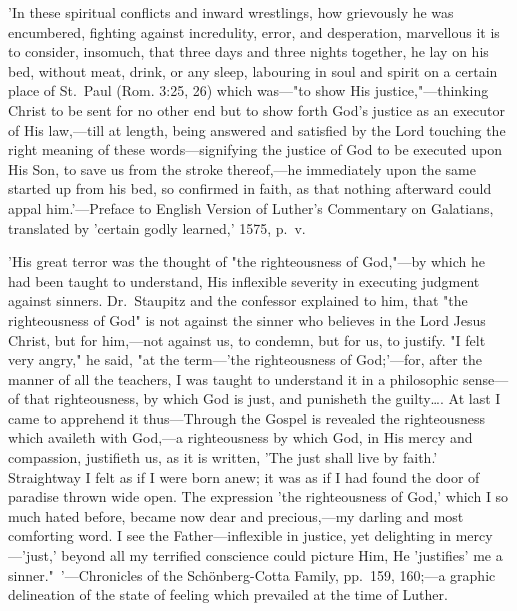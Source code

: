 \documentclass[
]{book}
\begin{document}
{  'In these spiritual conflicts and inward wrestlings, how grievously he was encumbered, fighting against incredulity, error, and desperation, marvellous it is to consider, insomuch, that three days and three nights together, he lay on his bed, without meat, drink, or any sleep, labouring in soul and spirit on a certain place of St.~Paul (Rom. 3:25, 26) which was---"to show His justice,"---thinking Christ to be sent for no other end but to show forth God's justice as an executor of His law,---till at length, being answered and satisfied by the Lord touching the right meaning of these words---signifying the justice of God to be executed upon His Son, to save us from the stroke thereof,---he immediately upon the same started up from his bed, so confirmed in faith, as that nothing afterward could appal him.'---Preface to English Version of Luther's Commentary on Galatians, translated by 'certain godly learned,' 1575, p.~v.

  'His great terror was the thought of "the righteousness of God,"---by which he had been taught to understand, His inflexible severity in executing judgment against sinners. Dr.~Staupitz and the confessor explained to him, that "the righteousness of God" is not against the sinner who believes in the Lord Jesus Christ, but for him,---not against us, to condemn, but for us, to justify. "I felt very angry," he said, "at the term---'the righteousness of God;'---for, after the manner of all the teachers, I was taught to understand it in a philosophic sense---of that righteousness, by which God is just, and punisheth the guilty\ldots. At last I came to apprehend it thus---Through the Gospel is revealed the righteousness which availeth with God,---a righteousness by which God, in His mercy and compassion, justifieth us, as it is written, 'The just shall live by faith.' Straightway I felt as if I were born anew; it was as if I had found the door of paradise thrown wide open. The expression 'the righteousness of God,' which I so much hated before, became now dear and precious,---my darling and most comforting word. I see the Father---inflexible in justice, yet delighting in mercy---'just,' beyond all my terrified conscience could picture Him, He 'justifies' me a sinner."~'---Chronicles of the Schönberg-Cotta Family, pp.~159, 160;---a graphic delineation of the state of feeling which prevailed at the time of Luther.

}
\end{document}
